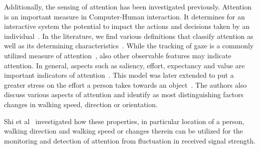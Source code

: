 \documentclass[12pt]{article}
\makeatletter
\renewcommand\paragraph{\@startsection{paragraph}{4}{\z@}%
  {-3.25ex\@plus -1ex \@minus -.2ex}%
  {1.5ex \@plus .2ex}%
  {\normalfont\normalsize\bfseries}}
\makeatother
\begin{document}
Additionally, the sensing of attention has been investigated previously. 
Attention is an important measure in Computer-Human interaction. 
It determines for an interactive system the potential to impact the actions and decisions taken by an individual~\cite{AttentionMonitoring_Xu_2012}.
In the literature, we find various definitions that classify attention as well as its determining characteristics~\cite{AttentionMonitoring_Wu_2007, AttentionMonitoring_Wickens_1984}.
While the tracking of gaze is a commonly utilized measure of attention~\cite{AttentionMonitoring_Yonezawa_2007}, also other observable features may indicate attention. 
In general, aspects such as saliency, effort, expectancy and value are important indicators of attention~\cite{AttentionMonitoring_Wickens_2008, AttentionMonitoring_Wickens_1984,AttentionMonitoring_Xu_2012,AttentionMonitoring_Gollan_2011}.
This model was later extended to put a greater stress on the effort a person takes towards an object~\cite{AttentionMonitoring_Ferscha_2012}.
The authors also discuss various aspects of attention and identify as most distinguishing factors changes in walking speed, direction or orientation.

Shi et al~\cite{Pervasive_Shi_2014} investigated how these properties, in particular location of a person, walking direction and walking speed or changes therein can be utilized for the monitoring and detection of attention from fluctuation in received signal strength. 
\end{document}
